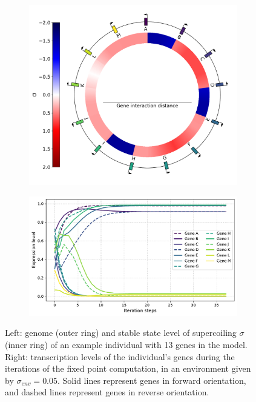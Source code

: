 \begin{figure}[H]
\centering
\begin{subfigure}[t]{0.42\textwidth}
\includegraphics[width=\textwidth]{alife/img/13genes_genome.pdf}
\label{subfig:alife:13genes_genome}
\end{subfigure}
\begin{subfigure}[t]{0.56\textwidth}
\includegraphics[width=\textwidth]{alife/img/13genes_expr_level.pdf}
\label{subfig:alife:13genes_expr}
\end{subfigure}
\caption[Example individual in the proof-of-concept model]{Left: genome (outer ring) and stable state level of supercoiling $\sigma$ (inner ring) of an example individual with 13 genes in the model.
Right: transcription levels of the individual's genes during the iterations of the fixed point computation, in an environment given by $\sigma_{env} = 0.05$.
Solid lines represent genes in forward orientation, and dashed lines represent genes in reverse orientation.}
\label{fig:alife:13genes}
\end{figure}

